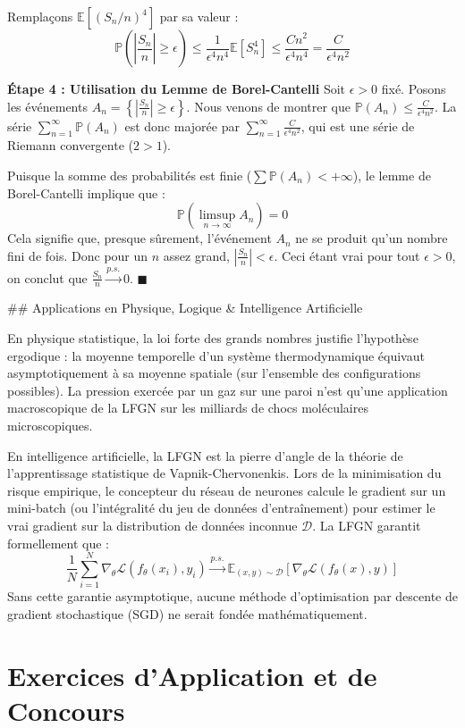 \documentclass[11pt,a4paper]{article}
\begin{document}
Remplaçons $\mathbb{E}[(S_n/n)^4]$ par sa valeur :
$$ \mathbb{P}\left( \left| \frac{S_n}{n} \right| \ge \epsilon \right) \le \frac{1}{\epsilon^4 n^4} \mathbb{E}[S_n^4] \le \frac{C n^2}{\epsilon^4 n^4} = \frac{C}{\epsilon^4 n^2} $$

\textbf{Étape 4 : Utilisation du Lemme de Borel-Cantelli}
Soit $\epsilon > 0$ fixé. Posons les événements $A_n = \left\{ \left| \frac{S_n}{n} \right| \ge \epsilon \right\}$.
Nous venons de montrer que $\mathbb{P}(A_n) \le \frac{C}{\epsilon^4 n^2}$.
La série $\sum_{n=1}^\infty \mathbb{P}(A_n)$ est donc majorée par $\sum_{n=1}^\infty \frac{C}{\epsilon^4 n^2}$, qui est une série de Riemann convergente ($2 > 1$).

Puisque la somme des probabilités est finie ($\sum \mathbb{P}(A_n) < +\infty$), le lemme de Borel-Cantelli implique que :
$$ \mathbb{P}\left( \limsup_{n \to \infty} A_n \right) = 0 $$
Cela signifie que, presque sûrement, l'événement $A_n$ ne se produit qu'un nombre fini de fois. Donc pour un $n$ assez grand, $\left| \frac{S_n}{n} \right| < \epsilon$.
Ceci étant vrai pour tout $\epsilon > 0$, on conclut que $\frac{S_n}{n} \xrightarrow{p.s.} 0$. $\blacksquare$

\#\# Applications en Physique, Logique \& Intelligence Artificielle

En physique statistique, la loi forte des grands nombres justifie l'hypothèse ergodique : la moyenne temporelle d'un système thermodynamique équivaut asymptotiquement à sa moyenne spatiale (sur l'ensemble des configurations possibles). La pression exercée par un gaz sur une paroi n'est qu'une application macroscopique de la LFGN sur les milliards de chocs moléculaires microscopiques.

En intelligence artificielle, la LFGN est la pierre d'angle de la théorie de l'apprentissage statistique de Vapnik-Chervonenkis. Lors de la minimisation du risque empirique, le concepteur du réseau de neurones calcule le gradient sur un mini-batch (ou l'intégralité du jeu de données d'entraînement) pour estimer le vrai gradient sur la distribution de données inconnue $\mathcal{D}$. La LFGN garantit formellement que :
$$ \frac{1}{N} \sum_{i=1}^N \nabla_\theta \mathcal{L}(f_\theta(x_i), y_i) \xrightarrow{p.s.} \mathbb{E}_{(x,y)\sim \mathcal{D}} [\nabla_\theta \mathcal{L}(f_\theta(x), y)] $$
Sans cette garantie asymptotique, aucune méthode d'optimisation par descente de gradient stochastique (SGD) ne serait fondée mathématiquement.


\newpage
\part{Exercices d'Application et de Concours}
\end{document}
